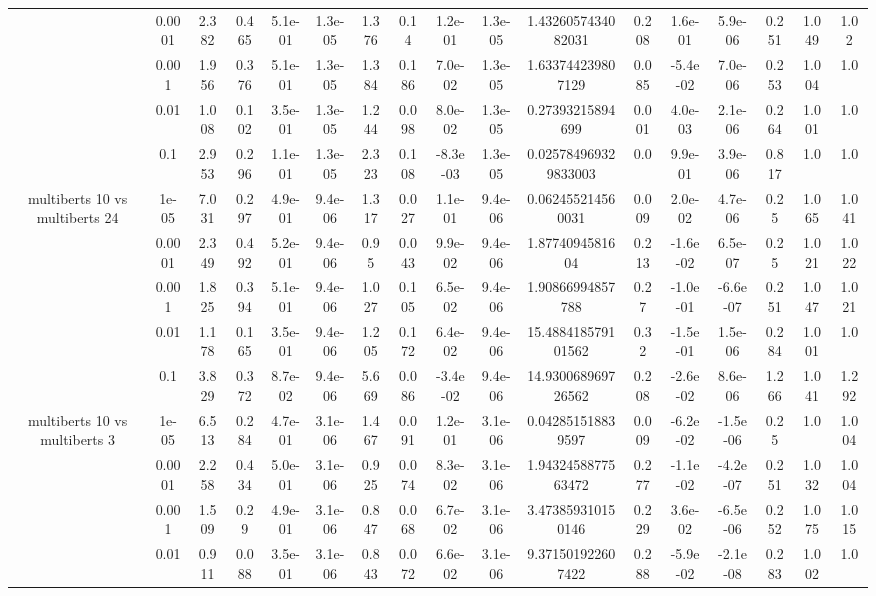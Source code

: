 \begin{tabular}{|c|c|c|c|c|c|c|c|c|c|c|c|c|c|c|c|c|}
 & 0.0001 & 2.382 & 0.465 & 5.1e-01 & 1.3e-05 & 1.376 & 0.14 & 1.2e-01 & 1.3e-05 & 1.4326057434082031 & 0.208 & 1.6e-01 & 5.9e-06 & 0.251 & 1.049 & 1.02 \\
 & 0.001 & 1.956 & 0.376 & 5.1e-01 & 1.3e-05 & 1.384 & 0.186 & 7.0e-02 & 1.3e-05 & 1.633744239807129 & 0.085 & -5.4e-02 & 7.0e-06 & 0.253 & 1.004 & 1.0 \\
 & 0.01 & 1.008 & 0.102 & 3.5e-01 & 1.3e-05 & 1.244 & 0.098 & 8.0e-02 & 1.3e-05 & 0.27393215894699 & 0.001 & 4.0e-03 & 2.1e-06 & 0.264 & 1.001 & 1.0 \\
 & 0.1 & 2.953 & 0.296 & 1.1e-01 & 1.3e-05 & 2.323 & 0.108 & -8.3e-03 & 1.3e-05 & 0.025784969329833003 & 0.0 & 9.9e-01 & 3.9e-06 & 0.817 & 1.0 & 1.0 \\
\hline
\multirow{5}{*}{multiberts 10 vs multiberts 24} & 1e-05 & 7.031 & 0.297 & 4.9e-01 & 9.4e-06 & 1.317 & 0.027 & 1.1e-01 & 9.4e-06 & 0.062455214560031 & 0.009 & 2.0e-02 & 4.7e-06 & 0.25 & 1.065 & 1.041 \\
 & 0.0001 & 2.349 & 0.492 & 5.2e-01 & 9.4e-06 & 0.95 & 0.043 & 9.9e-02 & 9.4e-06 & 1.8774094581604 & 0.213 & -1.6e-02 & 6.5e-07 & 0.25 & 1.021 & 1.022 \\
 & 0.001 & 1.825 & 0.394 & 5.1e-01 & 9.4e-06 & 1.027 & 0.105 & 6.5e-02 & 9.4e-06 & 1.90866994857788 & 0.27 & -1.0e-01 & -6.6e-07 & 0.251 & 1.047 & 1.021 \\
 & 0.01 & 1.178 & 0.165 & 3.5e-01 & 9.4e-06 & 1.205 & 0.172 & 6.4e-02 & 9.4e-06 & 15.488418579101562 & 0.32 & -1.5e-01 & 1.5e-06 & 0.284 & 1.001 & 1.0 \\
 & 0.1 & 3.829 & 0.372 & 8.7e-02 & 9.4e-06 & 5.669 & 0.086 & -3.4e-02 & 9.4e-06 & 14.930068969726562 & 0.208 & -2.6e-02 & 8.6e-06 & 1.266 & 1.041 & 1.292 \\
\hline
\multirow{5}{*}{multiberts 10 vs multiberts 3} & 1e-05 & 6.513 & 0.284 & 4.7e-01 & 3.1e-06 & 1.467 & 0.091 & 1.2e-01 & 3.1e-06 & 0.042851518839597 & 0.009 & -6.2e-02 & -1.5e-06 & 0.25 & 1.0 & 1.004 \\
 & 0.0001 & 2.258 & 0.434 & 5.0e-01 & 3.1e-06 & 0.925 & 0.074 & 8.3e-02 & 3.1e-06 & 1.9432458877563472 & 0.277 & -1.1e-02 & -4.2e-07 & 0.251 & 1.032 & 1.004 \\
 & 0.001 & 1.509 & 0.29 & 4.9e-01 & 3.1e-06 & 0.847 & 0.068 & 6.7e-02 & 3.1e-06 & 3.473859310150146 & 0.229 & 3.6e-02 & -6.5e-06 & 0.252 & 1.075 & 1.015 \\
 & 0.01 & 0.911 & 0.088 & 3.5e-01 & 3.1e-06 & 0.843 & 0.072 & 6.6e-02 & 3.1e-06 & 9.371501922607422 & 0.288 & -5.9e-02 & -2.1e-08 & 0.283 & 1.002 & 1.0 \\

\end{tabular}
